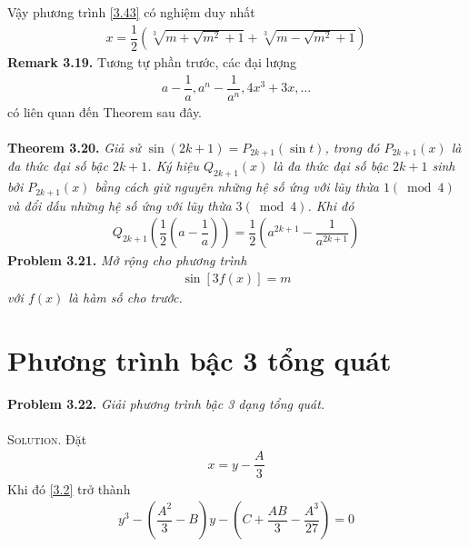 \documentclass[a4paper,oneside]{book}
\numberwithin{equation}{chapter}
\begin{document}
Vậy phương trình \eqref{3.43} có nghiệm duy nhất 
\begin{align}
x = \dfrac{1}{2}\left( {\sqrt[3]{{m + \sqrt {{m^2}}  + 1}} + \sqrt[3]{{m - \sqrt {{m^2}}  + 1}}} \right)
\end{align}
\textbf{Remark 3.19.} Tương tự phần trước, các đại lượng 
\begin{align}
a - \dfrac{1}{a},{a^n} - \dfrac{1}{{{a^n}}},4{x^3} + 3x,\ldots
\end{align}
có liên quan đến Theorem sau đây.\\
\\
\textbf{Theorem 3.20.} \textit{Giả sử $\sin \left( {2k + 1} \right) = {P_{2k + 1}}\left( {\sin t} \right)$, trong đó ${P_{2k + 1}}\left( x \right)$ là đa thức đại số bậc $2k+1$. Ký hiệu ${Q_{2k + 1}}\left( x \right)$ là đa thức đại số bậc $2k+1$ sinh bởi ${P_{2k + 1}}\left( x \right)$ bằng cách giữ nguyên những hệ số ứng với lũy thừa $1\left( {\bmod 4} \right)$ và đổi dấu những hệ số ứng với lũy thừa $3\left( {\bmod 4} \right)$. Khi đó}
\begin{align}
{Q_{2k + 1}}\left( {\dfrac{1}{2}\left( {a - \dfrac{1}{a}} \right)} \right) = \dfrac{1}{2}\left( {{a^{2k + 1}} - \dfrac{1}{{{a^{2k + 1}}}}} \right)
\end{align}
\textbf{Problem 3.21.} \textit{Mở rộng cho phương trình 
\begin{align}
\sin \left[ 3f\left( x \right)\right] = m
\end{align}
với $f\left(x\right)$ là hàm số cho trước.}
\section{Phương trình bậc 3 tổng quát}
\textbf{Problem 3.22.} \textit{Giải phương trình bậc 3 dạng tổng quát.}\\
\\
\textsc{Solution.} Đặt 
\begin{align}
x = y - \dfrac{A}{3}
\end{align}
Khi đó \eqref{3.2} trở thành
\begin{align}
\label{3.52}
{y^3} - \left( {\dfrac{{{A^2}}}{3} - B} \right)y - \left( {C + \dfrac{{AB}}{3} - \dfrac{{{A^3}}}{{27}}} \right) = 0
\end{align}
\end{document}

